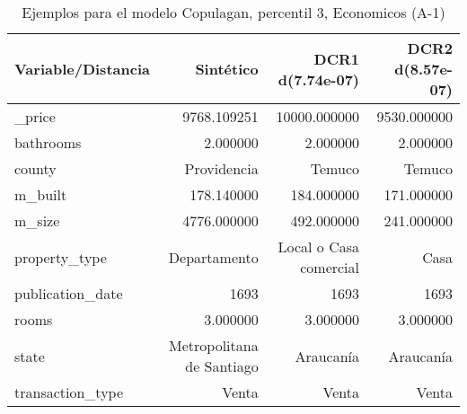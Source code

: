\begin{table}[H]
\centering
\fontsize{10}{14}\selectfont
\caption{Ejemplos para el modelo Copulagan, percentil 3, Economicos (A-1)}
\label{table-example-economicos-a-1-copulagan-3p}
\begin{tabular}{|l|r|r|r|}
\hline
\rowcolor[gray]{0.8}
Variable/Distancia & Sintético & DCR1 d(7.74e-07) & DCR2 d(8.57e-07) \\
\hline \_price & \cellcolor[rgb]{0.9, 0.54, 0.52} 9768.109251 & 10000.000000 & 9530.000000 \\
\hline bathrooms & \cellcolor[rgb]{0.9, 0.54, 0.52} 2.000000 & \cellcolor[rgb]{0.9, 0.54, 0.52} 2.000000 & \cellcolor[rgb]{0.9, 0.54, 0.52} 2.000000 \\
\hline county & \cellcolor[rgb]{0.9, 0.54, 0.52} Providencia & Temuco & Temuco \\
\hline m\_built & \cellcolor[rgb]{0.9, 0.54, 0.52} 178.140000 & 184.000000 & 171.000000 \\
\hline m\_size & \cellcolor[rgb]{0.9, 0.54, 0.52} 4776.000000 & 492.000000 & 241.000000 \\
\hline property\_type & \cellcolor[rgb]{0.9, 0.54, 0.52} Departamento & Local o Casa comercial & Casa \\
\hline publication\_date & \cellcolor[rgb]{0.9, 0.54, 0.52} 1693 & \cellcolor[rgb]{0.9, 0.54, 0.52} 1693 & \cellcolor[rgb]{0.9, 0.54, 0.52} 1693 \\
\hline rooms & \cellcolor[rgb]{0.9, 0.54, 0.52} 3.000000 & \cellcolor[rgb]{0.9, 0.54, 0.52} 3.000000 & \cellcolor[rgb]{0.9, 0.54, 0.52} 3.000000 \\
\hline state & \cellcolor[rgb]{0.9, 0.54, 0.52} Metropolitana de Santiago & Araucanía & Araucanía \\
\hline transaction\_type & \cellcolor[rgb]{0.9, 0.54, 0.52} Venta & \cellcolor[rgb]{0.9, 0.54, 0.52} Venta & \cellcolor[rgb]{0.9, 0.54, 0.52} Venta \\
\hline
\end{tabular}
\end{table}
